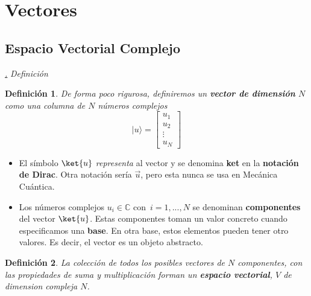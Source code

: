 \documentclass[a4paper,11pt]{book} %
\newtheorem{definicion_contador}{Definición}
\newcommand{\Definicion}[1]{
		\begin{mybox_gray2}{}
			\begin{definicion_contador}
				 #1 
			\end{definicion_contador} 
		\end{mybox_gray2}
	}
\numberwithin{equation}{chapter}
\def\subsubiContadorIt{\par\addtocounter{subsubsection}{1}\underline{\it\thesubsubsection.}\hskip0.5cm \setcounter{subsubsubsectionIt}{0}}
\newcommand{\SubsubiIt}[1]{
		\subsubiContadorIt \textit{#1}
	}
\newcounter{subsubsubsectionIt}[subsubsection]
\begin{document}
	
	
	\section{Vectores}
		
		\subsection{Espacio Vectorial Complejo}
		
			\SubsubiIt{Definición}
			
	\Definicion{
	De forma poco rigurosa, definiremos un \textbf{vector de dimensión} $N$ como una columna de $N$ números complejos 
\begin{equation}
|u\rangle = \begin{bmatrix} {u_1}\\ {u_2}\\ \vdots \\ {u_N} 
\end{bmatrix}
\end{equation}
	}
\begin{itemize}
	\item El símbolo $\ket{u}$  \textit{representa }al vector y se denomina \textbf{ket} en la \textbf{notación de Dirac}. Otra notación sería $\vec{u}$, pero esta nunca se usa en Mecánica Cuántica.

	\item Los números complejos $u_i \in {\mathbb C}$ con $\, i=1,...,N$ se denominan \textbf{componentes} del vector $\ket{u}$. Estas componentes toman un valor concreto cuando especificamos una \textbf{base}. En otra base, estos elementos pueden tener otro valores. Es decir, el vector es un objeto abstracto.
\end{itemize}
			
	\Definicion{
	La colección de todos los posibles vectores de $N$ componentes,  con las  propiedades de suma y multiplicación forman un \textbf{espacio vectorial}, $V$ de dimension compleja $N$.
	}			
\end{document}
